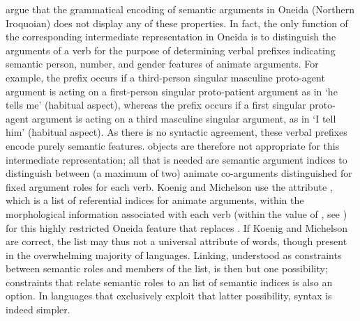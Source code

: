 \documentclass[output=paper
                ,modfonts
                ,nonflat
	        ,collection
	        ,collectionchapter
	        ,collectiontoclongg
 	        ,biblatex
                ,babelshorthands
                ,newtxmath
                ,draftmode
                ,colorlinks, citecolor=brown
]{./langsci/langscibook}
\begin{document}
\citet{KoenigandMichelson2014,KoenigandMichelson2015a,KoenigandMichelson2015b} argue that the grammatical encoding of semantic arguments in Oneida (Northern Iroquoian)  does not display any of these properties.  In fact, the only function of the
corresponding intermediate representation in Oneida is to distinguish
the arguments of a verb for the purpose of determining verbal
prefixes indicating semantic person, number, and gender
features of animate arguments.  
For example,  the prefix  occurs if a third-person singular masculine proto-agent argument is acting on a first-person singular proto-patient argument as in   `he tells me’ (habitual aspect), whereas  the prefix  occurs if a first singular proto-agent argument is acting on a third masculine singular argument, as in  `I tell him’ (habitual aspect).
 As there is no syntactic agreement, these verbal prefixes encode purely semantic features.
 objects are therefore not appropriate for this intermediate
representation; all that is needed are semantic argument indices to
distinguish between (a maximum of two) animate co-arguments
distinguished for fixed argument roles for each verb.
Koenig and Michelson use the attribute , which is a list of referential indices for animate arguments, within the morphological information associated with each verb (within the value of , see ) for this highly restricted
Oneida feature that replaces \argst. If Koenig and Michelson are correct, the \argst list may thus not a universal attribute of words, though present in the overwhelming majority of languages.
Linking, understood as constraints between semantic roles and members of the \argst list, is then but one possibility; constraints that relate semantic roles to an  list of semantic indices is also an option.
In languages that exclusively exploit that latter possibility, syntax is indeed simpler.
\end{document}
